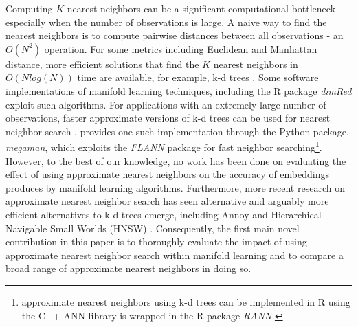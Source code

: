 \documentclass[11pt,a4paper,]{article}
\begin{document}
Computing \(K\) nearest neighbors can be a significant computational bottleneck especially when the number of observations is large. A naive way to find the nearest neighbors is to compute pairwise distances between all observations - an \(O(N^2)\) operation. For some metrics including Euclidean and Manhattan distance, more efficient solutions that find the \(K\) nearest neighbors in \(O(Nlog(N))\) time are available, for example, k-d trees \autocite{Bentley1975-zo}. Some software implementations of manifold learning techniques, including the R package \emph{dimRed} \autocite{Kraemer2018-zf} exploit such algorithms. For applications with an extremely large number of observations, faster approximate versions of k-d trees can be used for nearest neighbor search \autocite{Van_Der_Maaten2014-in}. \textcite{McQueen2016-xz} provides one such implementation through the Python package, \emph{megaman}, which exploits the \emph{FLANN} \autocite{Muja2009-de} package for fast neighbor searching\footnote{approximate nearest neighbors using k-d trees can be implemented in R using the C++ ANN library \autocite{mount2010-ann} is wrapped in the R package \emph{RANN} \autocite{jefferislab2019-l2}}. However, to the best of our knowledge, no work has been done on evaluating the effect of using approximate nearest neighbors on the accuracy of embeddings produces by manifold learning algorithms. Furthermore, more recent research on approximate nearest neighbor search has seen alternative and arguably more efficient alternatives to k-d trees emerge, including Annoy \autocite{Bernhardsson2016-tf} and Hierarchical Navigable Small Worlds (HNSW) \autocite{Malkov2020-jp}. Consequently, the first main novel contribution in this paper is to thoroughly evaluate the impact of using approximate nearest neighbor search within manifold learning and to compare a broad range of approximate nearest neighbors in doing so.
\end{document}

